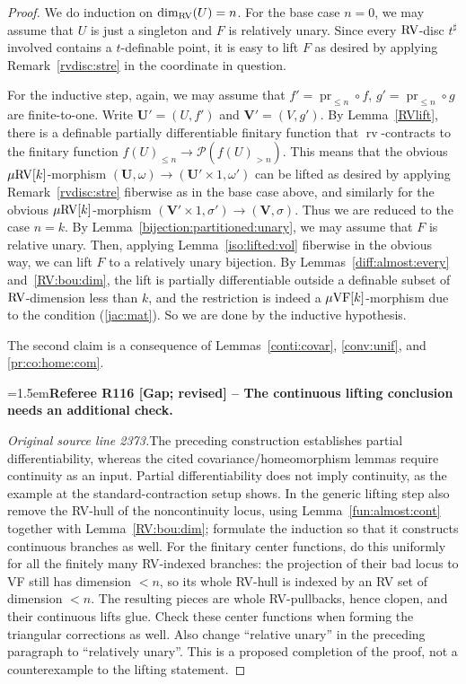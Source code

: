 \documentclass[12pt]{amsart}
\newcommand{\RefereeRemark}[4]{%
  \par\medskip\begingroup\normalfont\small\color{RefereePurple}%
  \emergencystretch=1.5em\noindent\textbf{Referee R#1 [#2] -- #3.}\par\nobreak\noindent #4\par
  \endgroup\medskip
}
\theoremstyle{plain}
\theoremstyle{definition}
\theoremstyle{remark}
\numberwithin{equation}{section}
\theoremstyle{plain}
\newcommand{\VF}{\textup{VF}}
\newcommand{\RV}{\textup{RV}}
\DeclareMathOperator{\pr}{pr}
\newcommand{\0}{\emptyset}
\newcommand{\mdl}[1]{\mathcal{#1}}  %
\newcommand{\fun}{\longrightarrow}
\newcommand{\mVF}{{\mu}{\VF}}
\newcommand{\mRV}{{\mu}{\RV}}
\DeclareMathOperator{\rv}{rv}
\begin{document}
\begin{proof}
We do induction on $\dim_{\RV}(U) = n$. For the base case $n=0$, we may assume that $U$ is just a singleton and $F$ is relatively unary. Since  every $\RV$-disc $t^\sharp$ involved contains a $t$-definable point, it is easy to lift $F$  as desired by applying Remark~\ref{rvdisc:stre} in the coordinate in question.

For the inductive step, again, we may assume that $f' = \pr_{\leq n} \circ f$, $g' = \pr_{\leq n} \circ g$ are finite-to-one. Write $\bm U' = (U, f')$ and $\bm V' = (V, g')$. By Lemma~\ref{RVlift}, there is a definable partially differentiable finitary function that $\rv$-contracts to the finitary function $f(U)_{\leq n} \fun \mdl P(f(U)_{> n})$. This means that the obvious $\mRV[k]$-morphism $(\bm U, \omega) \fun (\bm U' \times 1, \omega')$ can be lifted as desired by applying Remark~\ref{rvdisc:stre} fiberwise as in the base case above, and similarly for the obvious $\mRV[k]$-morphism $(\bm V' \times 1, \sigma') \fun (\bm V, \sigma)$. Thus we are reduced to the case $n = k$. By Lemma~\ref{bijection:partitioned:unary}, we may assume that $F$ is  relative unary. Then, applying Lemma~\ref{iso:lifted:vol} fiberwise in the obvious way, we can lift $F$ to a relatively unary bijection. By Lemmas~\ref{diff:almost:every} and~\ref{RV:bou:dim}, the lift is partially differentiable outside a definable subset of $\RV$-dimension less than $k$, and the restriction  is indeed a $\mVF[k]$-morphism due to the condition (\ref{jac:mat}). So we are done by  the inductive hypothesis.

The second claim is a consequence of Lemmas~\ref{conti:covar}, \ref{conv:unif}, and \ref{pr:co:home:com}.

\RefereeRemark{116}{Gap; revised}{The continuous lifting conclusion needs an additional check}{%
\textit{Original source line 2373.}\quad The preceding construction establishes partial differentiability, whereas the cited covariance/homeomorphism lemmas require continuity as an input. Partial differentiability does not imply continuity, as the example at the standard-contraction setup shows. In the generic lifting step also remove the RV-hull of the noncontinuity locus, using Lemma~\ref{fun:almost:cont} together with Lemma~\ref{RV:bou:dim}; formulate the induction so that it constructs continuous branches as well. For the finitary center functions, do this uniformly for all the finitely many RV-indexed branches: the projection of their bad locus to VF still has dimension $<n$, so its whole RV-hull is indexed by an RV set of dimension $<n$. The resulting pieces are whole RV-pullbacks, hence clopen, and their continuous lifts glue. Check these center functions when forming the triangular corrections as well. Also change ``relative unary'' in the preceding paragraph to ``relatively unary''. This is a proposed completion of the proof, not a counterexample to the lifting statement.
}
\end{proof}
\end{document}

